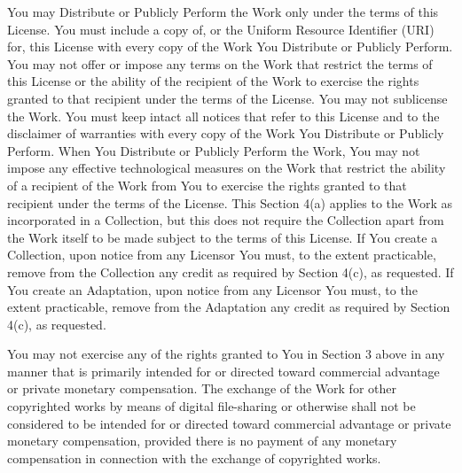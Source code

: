 \documentclass[oneside]{book}
\begin{document}
You may Distribute or Publicly Perform the Work only under the terms of this
License. You must include a copy of, or the Uniform Resource Identifier (URI)
for, this License with every copy of the Work You Distribute or Publicly
Perform. You may not offer or impose any terms on the Work that restrict the
terms of this License or the ability of the recipient of the Work to exercise
the rights granted to that recipient under the terms of the License. You may not
sublicense the Work. You must keep intact all notices that refer to this License
and to the disclaimer of warranties with every copy of the Work You Distribute
or Publicly Perform. When You Distribute or Publicly Perform the Work, You may
not impose any effective technological measures on the Work that restrict the
ability of a recipient of the Work from You to exercise the rights granted to
that recipient under the terms of the License. This Section 4(a) applies to the
Work as incorporated in a Collection, but this does not require the Collection
apart from the Work itself to be made subject to the terms of this License. If
You create a Collection, upon notice from any Licensor You must, to the extent
practicable, remove from the Collection any credit as required by Section 4(c),
as requested. If You create an Adaptation, upon notice from any Licensor You
must, to the extent practicable, remove from the Adaptation any credit as
required by Section 4(c), as requested.

You may not exercise any of the rights granted to You in Section 3 above in any
manner that is primarily intended for or directed toward commercial advantage or
private monetary compensation. The exchange of the Work for other copyrighted
works by means of digital file-sharing or otherwise shall not be considered to
be intended for or directed toward commercial advantage or private monetary
compensation, provided there is no payment of any monetary compensation in
connection with the exchange of copyrighted works.
\end{document}
